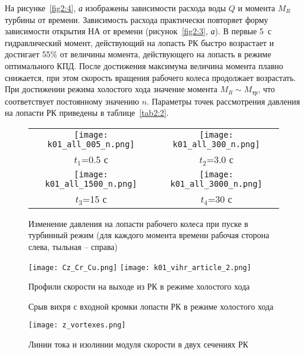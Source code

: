 На рисунке~\ref{fig2:4}, \emph{а} изображены зависимости расхода воды $Q$ и момента $M_R$  турбины от времени. 
Зависимость расхода практически повторяет форму зависимости открытия 
НА от времени (рисунок~\ref{fig2:3}, \emph{а}). 
В первые 5~с гидравлический момент, действующий на лопасть РК быстро возрастает и достигает 55\% от
величины момента, действующего на лопасть в режиме оптимального КПД. После достижения максимума величина 
момента плавно снижается, при этом скорость вращения рабочего колеса продолжает возрастать.
При достижении режима холостого хода значение момента $M_R\sim M_{\text{тр}}$, что соответствует постоянному 
значению $n$. Параметры точек рассмотрения давления на лопасти РК приведены в таблице~\ref{tab2:2}. 
\begin{figure}[!h]
  \centering
  \begin{tabular}{cc}
    \texttt{[image: k01\_all\_005\_n.png]}&
    \texttt{[image: k01\_all\_300\_n.png]} \\
    $t_1$=0.5 с&
    $t_2$=3.0 с \\
    \texttt{[image: k01\_all\_1500\_n.png]}&
    \texttt{[image: k01\_all\_3000\_n.png]} \\
    $t_3$=15 с&
    $t_4$=30 с
  \end{tabular} \par
  \caption{Изменение давления на лопасти рабочего колеса при пуске в турбинный режим
  (для каждого момента времени рабочая сторона слева, тыльная -- справа)}
  \label{fig2:5}
\end{figure}

\begin{figure}[hb!]
  \texttt{[image: Cz\_Cr\_Cu.png]} \hfill\texttt{[image: k01\_vihr\_article\_2.png]}\\
  \parbox{8.5cm} {\caption{Профили скорости на выходе из РК в режиме холостого хода}\label{fig2:6}}\hfill
  \parbox{8.5cm} {\caption{Срыв вихря с входной кромки лопасти РК в режиме холостого хода}\label{fig2:7}}
\end{figure}
\begin{figure}[hb!]
  \centering
  \texttt{[image: z\_vortexes.png]}
  \caption{Линии тока и изолинии модуля скорости в двух сечениях РК}
  \label{fig2:8}
\end{figure}


